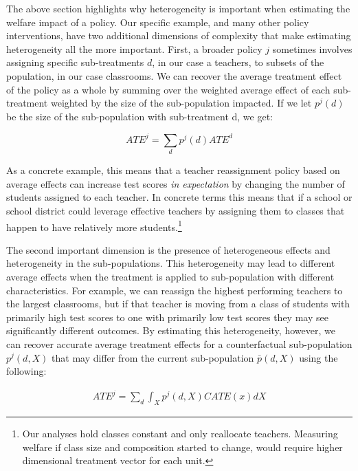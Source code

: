 \documentclass[12pt]{article}
\theoremstyle{definition}
\theoremstyle{definition}
\theoremstyle{definition}
\theoremstyle{definition}
\begin{document}
    The above section highlights why heterogeneity is important when estimating the welfare impact of a policy. Our specific example, and many other policy interventions, have two additional dimensions of complexity that make estimating heterogeneity all the more important. First, a broader policy $j$ sometimes involves assigning specific sub-treatments $d$, in our case a teachers, to subsets of the population, in our case classrooms. We can recover the average treatment effect of the policy as a whole by summing over the weighted average effect of each sub-treatment weighted by the size of the sub-population impacted. If we let $p^j(d)$ be the size of the sub-population with sub-treatment d, we get:

    \begin{equation}
       ATE^j = \sum_d p^j(d)ATE^d
    \end{equation}  

    As a concrete example, this means that a teacher reassignment policy based on average effects can increase test scores \textit{in expectation} by changing the number of students assigned to each teacher. In concrete terms this means that if a school or school district could leverage effective teachers by assigning them to classes that happen to have relatively more students.\footnote{Our analyses hold classes constant and only reallocate teachers. Measuring welfare if class size and composition started to change, would require higher dimensional treatment vector for each unit.} 
    
    The second important dimension is the presence of heterogeneous effects and heterogeneity in the sub-populations. This heterogeneity may lead to different average effects when the treatment is applied to sub-population with different characteristics. For example, we can reassign the highest performing teachers to the largest classrooms, but if that teacher is moving from a class of students with primarily high test scores to one with primarily low test scores they may see significantly different outcomes. By estimating this heterogeneity, however, we can recover accurate average treatment effects for a counterfactual sub-population $p^j(d,X)$ that may differ from the current sub-population $\bar{p}(d,X)$ using the following: 
    
    \begin{equation}
    \begin{aligned}
    ATE^j =  \sum_d \int_X p^j(d,X) CATE(x) dX
    \end{aligned}
    \end{equation} 
    
\end{document}
